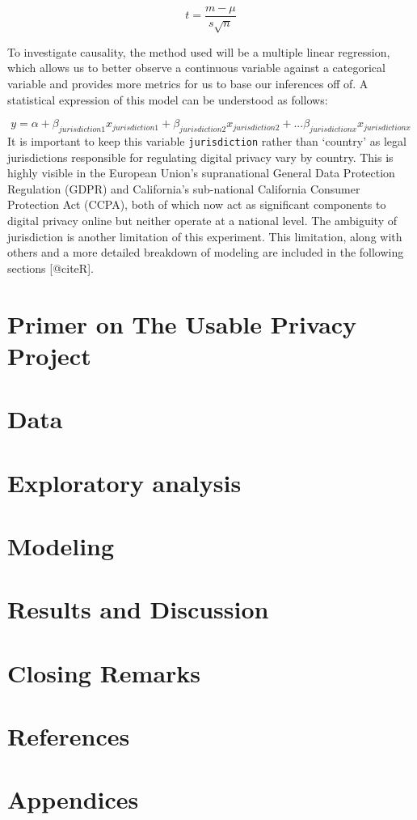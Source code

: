 \documentclass[
]{article}
\begin{document}
\[
t = \frac{m-\mu }{s\sqrt{n}} 
\]

To investigate causality, the method used will be a multiple linear
regression, which allows us to better observe a continuous variable
against a categorical variable and provides more metrics for us to base
our inferences off of. A statistical expression of this model can be
understood as follows:

\[
y = \alpha + \beta_{jurisdiction1}x_{jurisdiction1} + \beta_{jurisdiction2}x_{jurisdiction2}+... \beta_{jurisdictionx}x_{jurisdictionx} 
\] It is important to keep this variable \texttt{jurisdiction} rather
than `country' as legal jurisdictions responsible for regulating digital
privacy vary by country. This is highly visible in the European Union's
supranational General Data Protection Regulation (GDPR) and California's
sub-national California Consumer Protection Act (CCPA), both of which
now act as significant components to digital privacy online but neither
operate at a national level. The ambiguity of jurisdiction is another
limitation of this experiment. This limitation, along with others and a
more detailed breakdown of modeling are included in the following
sections {[}@citeR{]}.

\hypertarget{primer-on-the-usable-privacy-project}{%
\section{Primer on The Usable Privacy
Project}\label{primer-on-the-usable-privacy-project}}

\hypertarget{data}{%
\section{Data}\label{data}}

\hypertarget{exploratory-analysis}{%
\section{Exploratory analysis}\label{exploratory-analysis}}

\hypertarget{modeling}{%
\section{Modeling}\label{modeling}}

\hypertarget{results-and-discussion}{%
\section{Results and Discussion}\label{results-and-discussion}}

\hypertarget{closing-remarks}{%
\section{Closing Remarks}\label{closing-remarks}}

\hypertarget{references}{%
\section{References}\label{references}}

\hypertarget{appendices}{%
\section{Appendices}\label{appendices}}
\end{document}
